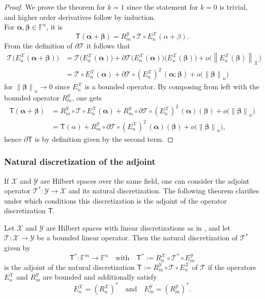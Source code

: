 \documentclass[a4paper]{paper}
\newcommand{\Spc}[1]{\mathscr{#1}}
\newcommand{\Field}{\mathbb{F}}
\newcommand{\Op}[1]{\mathcal{#1}}
\newcommand{\DiscOp}[1]{\mathsf{#1}}
\newcommand*{\EXT}[2]{\ensuremath{E_{#1}^{#2}}}
\newcommand*{\REST}[2]{\ensuremath{R_{#1}^{#2}}}
\newcommand*{\RnX}{\ensuremath{\REST{n}{\Spc{X}}}}
\newcommand*{\RmY}{\ensuremath{\REST{m}{\Spc{Y}}}}
\newcommand*{\EnX}{\ensuremath{\EXT{n}{\Spc{X}}}}
\newcommand*{\EmY}{\ensuremath{\EXT{m}{\Spc{Y}}}}
\newcommand{\valpha}{\boldsymbol{\alpha}}
\newcommand{\vbeta}{\boldsymbol{\beta}}
\newcommand*{\NORMLR}[1]{\ensuremath{\left\lVert #1 \right\rVert}}
\newcommand*{\NORM}[1]{\ensuremath{\lVert #1 \rVert}}
\begin{document}
\begin{proof}
 We prove the theorem for $k=1$ since the statement for $k=0$ is trivial, and higher order derivatives follow by 
 induction.\\
 For $\valpha,\vbeta \in \Field^n$, it is
 \begin{equation*}
  \DiscOp{T}(\valpha + \vbeta) = \RmY \circ \Op{T} \circ \EnX (\alpha + \beta).
 \end{equation*}
 From the definition of $\partial \Op{T}$ it follows that
 \begin{align*}
  \Op{T}\big(\EnX(\valpha + \vbeta)\big)
  &= \Op{T}\big(\EnX(\valpha)\big) + \partial\Op{T}\big(\EnX(\valpha)\big)\big(\EnX(\vbeta)\big) +
  o\big(\NORMLR{\EnX(\vbeta)}_{\Spc{X}}\big) \\
  &= \Op{T} \circ \EnX(\valpha) + \partial\Op{T}\circ (\EnX)^2\,(\valpha; \vbeta) + o\big(\NORM{\vbeta}_n \big)
 \end{align*}
 for $\NORM{\vbeta}_n \to 0$ since $\EnX$ is a bounded operator. By composing from left with the bounded operator 
 $\RmY$, one gets
 \begin{align*}
  \DiscOp{T}(\valpha + \vbeta)
  &= \RmY \circ \Op{T} \circ \EnX(\valpha) + \RmY \circ \partial\Op{T}\circ (\EnX)^2\,(\valpha)(\vbeta) +
  o\big(\NORM{\vbeta}_n \big) 
  \\
  &= \DiscOp{T}(\alpha) + \RmY \circ \partial\Op{T}\circ (\EnX)^2\,(\valpha)(\vbeta) + o\big(\NORM{\vbeta}_n \big),
 \end{align*}
 hence $\partial\DiscOp{T}$ is by definition given by the second term.
\end{proof}


\subsubsection{Natural discretization of the adjoint}

If $\Spc{X}$ and $\Spc{Y}$ are Hilbert spaces over the same field, one can consider the adjoint operator 
$\Op{T}^* \colon \Spc{Y} \to \Spc{X}$ and its natural discretization. The following theorem clarifies under which 
conditions this discretization is the adjoint of the operator discretization $\DiscOp{T}$.
%
\begin{lemma}
 Let $\Spc{X}$ and $\Spc{Y}$ are Hilbert spaces with linear discretizations as in , 
 and let $\Op{T} \colon \Spc{X} \to \Spc{Y}$ be a bounded linear operator. Then the natural discretization of 
 $\Op{T}^*$ given by
 \begin{equation*}
  \DiscOp{T}^* \colon \Field^m \to \Field^n
  \quad \text{with} \quad
  \DiscOp{T}^* := \RnX \circ \Op{T}^* \circ \EmY
 \end{equation*}
 is the adjoint of the natural discretization $\DiscOp{T} := \RmY \circ \Op{T} \circ \EnX$ of $\Op{T}$ if the operators 
 $\EnX$ and $\RmY$ are bounded and additionally satisfy
 \begin{equation*}
  \EnX = (\RnX)^* \quad \text{and} \quad \EmY = (\RmY)^*.
 \end{equation*}
\end{lemma}
\end{document}
